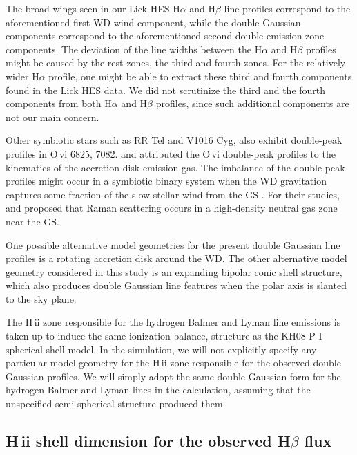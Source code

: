 \documentclass[a4paper,fleqn,usenatbib,useAMS]{mnras}
\def\ha{H{$\alpha$}}
\def\hb{H{$\beta$}}
\def\hii{H\,{\sc ii}}
\def\ovi{O\,{\sc vi}}
\begin{document}
{The broad wings seen in our Lick HES {\ha} and {\hb} line profiles correspond to the aforementioned first WD wind component, while the double Gaussian components correspond to the aforementioned second double emission zone components.
The deviation of the line widths between the {\ha} and {\hb} profiles might be caused by the rest zones, the third and fourth zones. For the relatively wider {\ha} profile, one might be able to extract these third and fourth components found in the Lick HES data. We did not scrutinize the third and the fourth components from both {\ha} and {\hb} profiles, since such additional components are not our main concern.

Other symbiotic stars such as RR Tel and V1016 Cyg, also exhibit double-peak profiles in {\ovi} 6825, 7082. \citet{lee99} and \citet{heo15} attributed the {\ovi} double-peak profiles to the kinematics of the accretion disk emission gas. The imbalance of the double-peak profiles might occur in a symbiotic binary system when the WD gravitation captures some fraction of the slow stellar wind from the GS \citep{dev09, mas98}. For their studies, \citet{lee99} and \citet{heo15} proposed that Raman scattering occurs in a high-density neutral gas zone near the GS.

One possible alternative model geometries for the present double Gaussian line profiles is a rotating accretion disk around the WD. The other alternative model geometry considered in this study is an expanding bipolar conic shell structure, which also produces double Gaussian line features when the polar axis is slanted to the sky plane.

The {\hii} zone responsible for the hydrogen Balmer and Lyman line emissions is taken up to induce the same ionization balance, structure as the KH08 P-I spherical shell model. In the simulation, we will not explicitly specify any particular model geometry for the {\hii} zone responsible for the observed double Gaussian profiles.
We will simply adopt the same double Gaussian form for the hydrogen Balmer and Lyman lines in the calculation, assuming that the unspecified semi-spherical structure produced them.

\subsection{{\hii} shell dimension for
the observed {\hb} flux}

}
\end{document}
